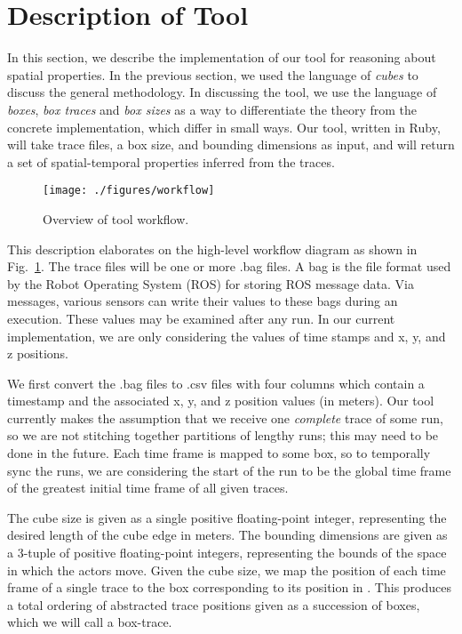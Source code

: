 \section{Description of Tool}
\label{sec:tool}

In this section, we describe the implementation of our tool for reasoning about spatial properties.
In the previous section, we used the language of \emph{cubes} to discuss the general methodology. 
In discussing the tool, we use the language of \emph{boxes}, \emph{box traces} and \emph{box sizes} as a way to differentiate the theory from the concrete implementation, which differ in small ways.
Our tool, written in Ruby, will take trace files, a box size, and bounding dimensions as input, and will return a set of spatial-temporal properties inferred from the traces.  

\begin{figure}[ht]
  \centering
  \texttt{[image: ./figures/workflow]}
  \caption{Overview of tool workflow.}
  \label{fig:workflow}
\end{figure}

This description elaborates on the high-level workflow diagram as shown in Fig.~\ref{fig:workflow}.
The trace files will be one or more .bag files.  
A bag is the file format used by the Robot Operating System (ROS) for storing ROS message data.  
Via messages, various sensors can write their values to these bags during an execution. 
These values may be examined after any run.
In our current implementation, we are only considering the values of time stamps and x, y, and z positions.

We first convert the .bag files to .csv files with four columns which contain a timestamp and the associated x, y, and z position values (in meters).  
 Our tool currently makes the assumption that we receive one \emph{complete} trace of some run, so we are not stitching together partitions of lengthy runs; this may need to be done in the future.
 Each time frame is mapped to some box, so to temporally sync the runs, we are considering the start of the run to be the global time frame of the greatest initial time frame of all given traces.

The cube size is given as a single positive floating-point integer, representing the desired length of the cube edge in meters.
The bounding dimensions are given as a 3-tuple of positive floating-point integers, representing the bounds of the space in which the actors move.
Given the cube size, we map the position of each time frame of a single trace to the box corresponding to its position in \rthree.
 This produces a total ordering of abstracted trace positions given as a succession of boxes, which we will call a box-trace.
 
